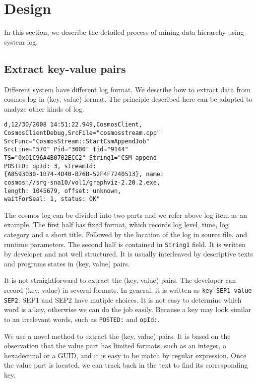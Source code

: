 
\section{Design}
\label{sec:design}

In this section, we describe the detailed process of mining
data hierarchy using system log.

\subsection{Extract key-value pairs}

Different system have different log format. We describe how
to extract data from cosmos log in (key, value) format. The
principle described here can be adopted to analyze 
other kinds of log.

\begin{verbatim}
d,12/30/2008 14:51:22.949,CosmosClient,
CosmosClientDebug,SrcFile="cosmosstream.cpp"
SrcFunc="CosmosStream::StartCsmAppendJob" 
SrcLine="570" Pid="3000" Tid="9144"
TS="0x01C96A4B0702ECC2" String1="CSM append
POSTED: opId: 3, streamId:
{A8593030-1B74-4D40-B76B-52F4F7240513}, name:
cosmos://srg-sna10/vol1/graphviz-2.20.2.exe,
length: 1045679, offset: unknown,
waitForSeal: 1, status: OK"
\end{verbatim}

The cosmos log can be divided into two parts and we refer
above log item as an example. The first half has fixed
format, which records log level, time, log category and a
short title. Followed by the location of the log in source
file, and runtime parameters. The second half is contained
in \texttt{String1} field. It is written by developer and 
not well structured. It is usually interleaved by 
descriptive texts and programs states in (key, value) pairs.

It is not straightforward to extract the (key, value) pairs.
The developer can record (key, value) in several formats. In
general, it is written as \texttt{key SEP1 value
SEP2}. SEP1 and SEP2 have mutiple choices.
It is not easy to determine which word is a key, otherwise
we can do the job easily. Because a key may look similar to
an irrelevant words, such as \texttt{POSTED:} and
\texttt{opId:}.

We use a novel method to extract the (key, value) pairs. It
is based on the observation that the value part has limited
formats, such as an integer, a hexadecimal or a GUID, and it
is easy to be match by regular expression. Once the value
part is located, we can track back in the text to find its
corresponding key.

